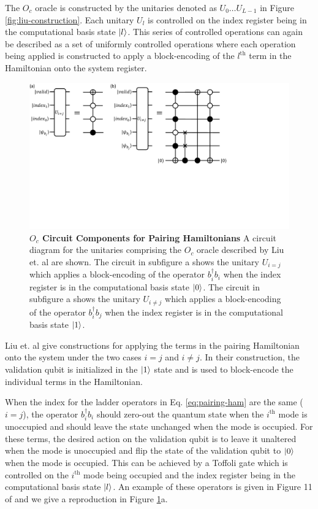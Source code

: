 The $O_c$ oracle is constructed by the unitaries denoted as $U_0 \dots U_{L - 1}$ in Figure \ref{fig:liu-construction}.
Each unitary $U_l$ is controlled on the index register being in the computational basis state $\ket{l}$.
This series of controlled operations can again be described as a set of uniformly controlled operations where each operation being applied is constructed to apply a block-encoding of the $l^\text{th}$ term in the Hamiltonian onto the system register.

\begin{figure}[h]
    \includegraphics[width=12cm]{figures/liu-O_c.pdf}
    \caption{
        \textbf{$O_c$ Circuit Components for Pairing Hamiltonians}
        A circuit diagram for the unitaries comprising the $O_c$ oracle described by Liu et. al \cite{liu2024efficient} are shown.
        The circuit in subfigure a shows the unitary $U_{i = j}$ which applies a block-encoding of the operator $b_i^\dagger b_i$ when the index register is in the computational basis state $\ket{0}$. 
        The circuit in subfigure a shows the unitary $U_{i \neq j}$ which applies a block-encoding of the operator $b_i^\dagger b_j$ when the index register is in the computational basis state $\ket{1}$. 
    }
    \label{fig:liu-O_c}
\end{figure}

Liu et. al give constructions for applying the terms in the pairing Hamiltonian onto the system under the two cases $i = j$ and $i \neq j$.
In their construction, the validation qubit is initialized in the $\ket{1}$ state and is used to block-encode the individual terms in the Hamiltonian.

When the index for the ladder operators in Eq. \ref{eq:pairing-ham} are the same ($i = j$), the operator $b_i^\dagger b_i$ should zero-out the quantum state when the $i^\text{th}$ mode is unoccupied and should leave the state unchanged when the mode is occupied. 
For these terms, the desired action on the validation qubit is to leave it unaltered when the mode is unoccupied and flip the state of the validation qubit to $\ket{0}$ when the mode is occupied.
This can be achieved by a Toffoli gate which is controlled on the $i^\text{th}$ mode being occupied and the index register being in the computational basis state $\ket{l}$.
An example of these operators is given in Figure 11 of \cite{liu2024efficient} and we give a reproduction in Figure \ref{fig:liu-O_c}a.

